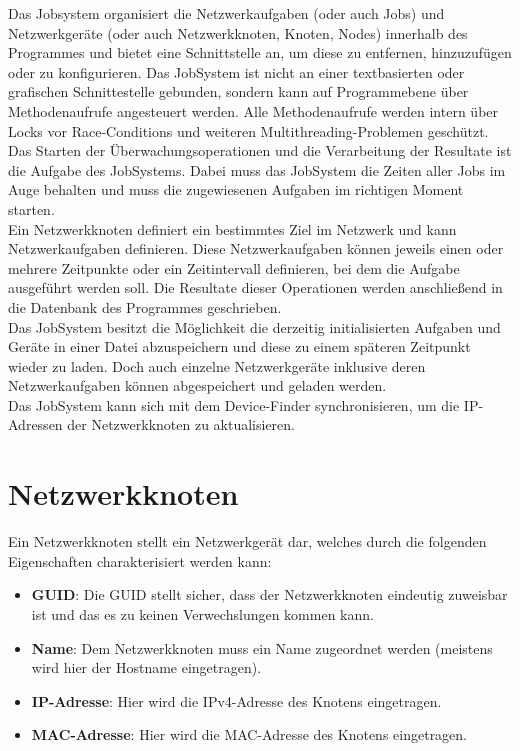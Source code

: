 \documentclass[12pt,a4paper]{report}
\begin{document}
\begin{onehalfspace}
Das Jobsystem organisiert die Netzwerkaufgaben (oder auch Jobs) und Netzwerkgeräte (oder auch Netzwerkknoten, Knoten, Nodes) innerhalb des Programmes und bietet eine Schnittstelle an, um diese zu entfernen, hinzuzufügen oder zu konfigurieren. Das JobSystem ist nicht an einer textbasierten oder grafischen Schnittestelle gebunden, sondern kann auf Programmebene über Methodenaufrufe angesteuert werden. Alle Methodenaufrufe werden intern über Locks vor Race-Conditions und weiteren Multithreading-Problemen geschützt.\\
Das Starten der Überwachungsoperationen und die Verarbeitung der Resultate ist die Aufgabe des JobSystems. Dabei muss das JobSystem die Zeiten aller Jobs im Auge behalten und muss die zugewiesenen Aufgaben im richtigen Moment starten.\\
Ein Netzwerkknoten definiert ein bestimmtes Ziel im Netzwerk und kann Netzwerkaufgaben definieren. Diese Netzwerkaufgaben können jeweils einen oder mehrere Zeitpunkte oder ein Zeitintervall definieren, bei dem die Aufgabe ausgeführt werden soll. Die Resultate dieser Operationen werden anschließend in die Datenbank des Programmes geschrieben.\\
Das JobSystem besitzt die Möglichkeit die derzeitig initialisierten Aufgaben und Geräte in einer Datei abzuspeichern und diese zu einem späteren Zeitpunkt wieder zu laden. Doch auch einzelne Netzwerkgeräte inklusive deren Netzwerkaufgaben können abgespeichert und geladen werden.\\
Das JobSystem kann sich mit dem Device-Finder synchronisieren, um die IP-Adressen der Netzwerkknoten zu aktualisieren.

\newpage
\section{Netzwerkknoten}

Ein Netzwerkknoten stellt ein Netzwerkgerät dar, welches durch die folgenden Eigenschaften charakterisiert werden kann:

\begin{itemize}
\item \textbf{GUID}: Die GUID stellt sicher, dass der Netzwerkknoten eindeutig zuweisbar ist und das es zu keinen Verwechslungen kommen kann.
\item \textbf{Name}: Dem Netzwerkknoten muss ein Name zugeordnet werden (meistens wird hier der Hostname eingetragen).
\item \textbf{IP-Adresse}: Hier wird die IPv4-Adresse des Knotens eingetragen.
\item \textbf{MAC-Adresse}: Hier wird die MAC-Adresse des Knotens eingetragen.
\end{itemize}


\end{onehalfspace}
\end{document}
